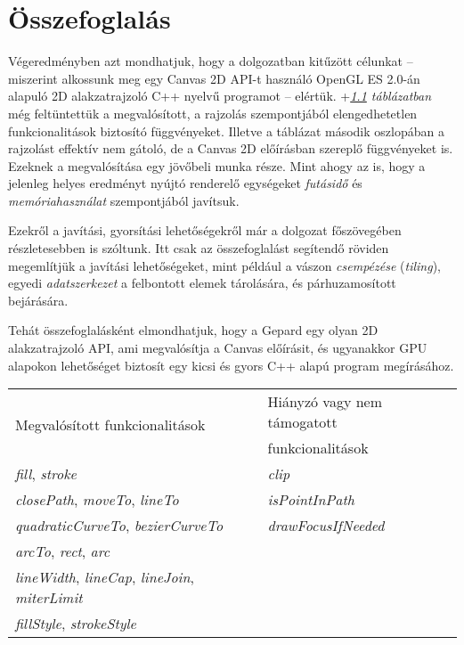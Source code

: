 \documentclass[12pt]{report}
\theoremstyle{definition}
\newcommand{\inenglish}[1]{\textsl{#1}}
\newcommand{\func}[1]{{\textsl{#1}}}
\begin{document}

    \chapter{Összefoglalás}

Végeredményben azt mondhatjuk, hogy a dolgozatban kitűzött célunkat -- miszerint
alkossunk meg egy Canvas 2D API-t használó OpenGL ES 2.0-án alapuló 2D
alakzatrajzoló C++ nyelvű programot -- elértük. \Az+\emph{\ref{tab:functions}
táblázatban} még feltüntettük a megvalósított, a rajzolás szempontjából
elengedhetetlen funkcionalitások biztosító függvényeket. Illetve a táblázat
második oszlopában a rajzolást effektív nem gátoló, de a Canvas 2D előírásban
szereplő függvényeket is. Ezeknek a megvalósítása egy jövőbeli munka
része. Mint ahogy az is, hogy a jelenleg helyes eredményt nyújtó renderelő
egységeket \emph{futásidő} és \emph{memóriahasználat} szempontjából javítsuk.

Ezekről a javítási, gyorsítási lehetőségekről már a dolgozat főszövegében
részletesebben is szóltunk. Itt csak az összefoglalást segítendő röviden
megemlítjük a javítási lehetőségeket, mint például a vászon \emph{csempézése}
(\inenglish{tiling}), egyedi \emph{adatszerkezet} a felbontott elemek
tárolására, és párhuzamosított bejárására.

Tehát összefoglalásként elmondhatjuk, hogy a Gepard egy olyan 2D
alakzatrajzoló API, ami megvalósítja a Canvas előírásit, és ugyanakkor
GPU alapokon lehetőséget biztosít egy kicsi és gyors C++ alapú program
megírásához.

  \begin{table}[b]
    \label{tab:functions}
    \renewcommand*{\arraystretch}{1.2}
    \centering
    \begin{tabular}{|l|l|}
      \hline
      \multirow{2}{*}{Megvalósított funkcionalitások} & Hiányzó vagy nem
      támogatott \\
      & funkcionalitások \\
      \hline \hline
      \func{fill}, \func{stroke} & \func{clip} \\ \cline{1-1}
      \func{closePath}, \func{moveTo}, \func{lineTo}  & \func{isPointInPath} \\
      \cline{2-2}
      \func{quadraticCurveTo}, \func{bezierCurveTo} & \func{drawFocusIfNeeded}
      \\
      \func{arcTo}, \func{rect}, \func{arc} &  \\ \cline{1-1}
      \func{lineWidth}, \func{lineCap}, \func{lineJoin}, \func{miterLimit} & \\
      \func{fillStyle}, \func{strokeStyle} &  \\
      \hline
    \end{tabular}
  \end{table}
\end{document}
